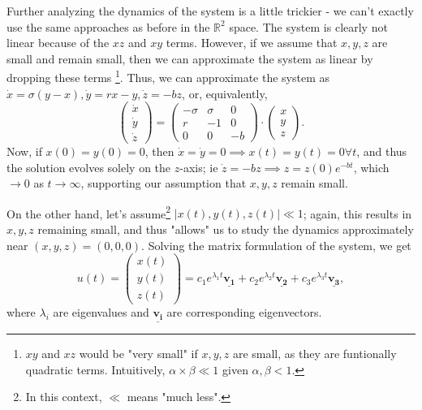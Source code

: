 \documentclass[12pt]{article}
\begin{document}
Further analyzing the dynamics of the system is a little trickier - we can't exactly use the same approaches as before in the $\mathbb{R}^2$ space. The system is clearly not linear because of the $xz$ and $xy$ terms. However, if we assume that $x, y,z$ are small and remain small, then we can approximate the system as linear by dropping these terms \footnote{$xy$ and $xz$ would be "very small" if $x, y,z$ are small, as they are funtionally quadratic terms. Intuitively, $\alpha \times \beta \ll 1$ given $\alpha, \beta < 1$.}. Thus, we can approximate the system as $\dot{x} = \sigma(y-x), \dot{y} = rx-y, \dot{z} = -bz$, or, equivalently, \[\begin{pmatrix}
  \dot{x}\\
  \dot{y}\\
  \dot{z}
\end{pmatrix} = \begin{pmatrix}
- \sigma &\sigma &0\\
r & -1 & 0\\
0 & 0 & -b
\end{pmatrix}\cdot \begin{pmatrix}
  x\\
  y\\
  z
\end{pmatrix}.\] Now, if $x(0) = y(0) = 0$, then $\dot{x}=\dot{y} = 0 \implies x(t) = y(t) = 0 \forall t$, and thus the solution evolves solely on the $z$-axis; ie $\dot{z} = -b z \implies z = z(0)e^{-bt}$, which $\to 0$ as $t \to\infty$, supporting our assumption that $x,y,z$ remain small. 

On the other hand, let's assume\footnote{In this context, $\ll$ means "much less".} $|x(t), y(t),z(t)|\ll 1$; again, this results in $x,y,z$ remaining small, and thus "allows" us to study the dynamics approximately near $(x,y,z) = (0,0,0)$. Solving the matrix formulation of the system, we get \[u(t) = \begin{pmatrix}
  x(t)\\
  y(t)\\
  z(t)\end{pmatrix} = c_1 e^{\lambda_1 t} \underline{\mathbf{v_1}} + c_2 e^{\lambda_2 t} \underline{\mathbf{v_2}} + c_3 e^{\lambda_3 t} \underline{\mathbf{v_3}},
\] where $\lambda_i$ are eigenvalues and $\underline{\mathbf{v_i}}$ are corresponding eigenvectors.
\end{document}
